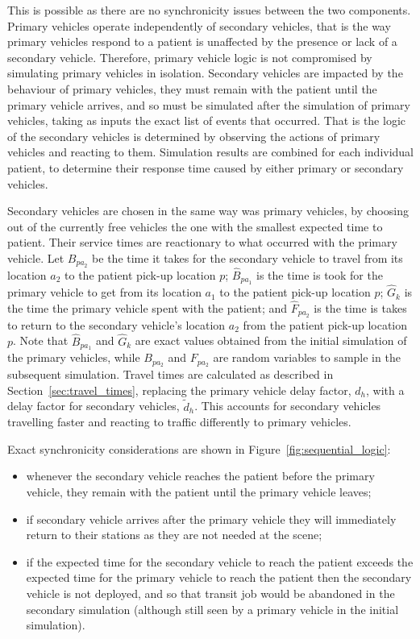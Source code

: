 \documentclass[preprint,12pt]{elsarticle}
\begin{document}
This is possible as there are no synchronicity issues between the two
components. Primary vehicles operate independently of secondary vehicles, that
is the way primary vehicles respond to a patient is unaffected by the presence
or lack of a secondary vehicle.
Therefore, primary vehicle logic is not compromised by simulating primary
vehicles in isolation.
Secondary vehicles are impacted by the behaviour of primary vehicles, they
must remain with the patient until the primary vehicle arrives, and so must be
simulated after the simulation of primary vehicles, taking as inputs the exact
list of events that occurred. That is the logic of the secondary vehicles is
determined by observing the actions of primary vehicles and reacting to them.
Simulation results are combined for each individual patient, to determine
their response time caused by either primary or secondary vehicles.

Secondary vehicles are chosen in the same way was primary vehicles, by choosing
out of the currently free vehicles the one with the smallest expected time to
patient. Their service times are reactionary to what occurred with the primary
vehicle.
Let $B_{pa_2}$ be the time it takes for the secondary vehicle to travel from
its location $a_2$ to the patient pick-up location $p$; $\hat{B}_{pa_1}$ is the
time is took for the primary vehicle to get from its location $a_1$ to the
patient pick-up location $p$; $\hat{G}_k$ is the time the primary vehicle spent
with the patient; and $\hat{F}_{pa_2}$ is the time is takes to return to the
secondary vehicle's location $a_2$ from the patient pick-up location $p$.
Note that $\hat{B}_{pa_1}$ and $\hat{G}_k$ are exact values obtained from the
initial simulation of the primary vehicles, while $B_{pa_2}$ and $F_{pa_2}$ are
random variables to sample in the subsequent simulation.
Travel times are calculated as described in Section~\ref{sec:travel_times},
replacing the primary vehicle delay factor, $d_h$, with a delay factor for
secondary vehicles, $\tilde{d}_h$. This accounts for secondary vehicles
travelling faster and reacting to traffic differently to primary vehicles.

Exact synchronicity considerations are shown in Figure~\ref{fig:sequential_logic}:
\begin{itemize}
  \item whenever the secondary vehicle reaches the patient before the primary
  vehicle, they remain with the patient until the primary vehicle leaves;
  \item if secondary vehicle arrives after the primary vehicle they will
  immediately return to their stations as they are not needed at the scene;
  \item if the expected time for the secondary vehicle to reach the patient
  exceeds the expected time for the primary vehicle to reach the patient then
  the secondary vehicle is not deployed, and so that transit job would be
  abandoned in the secondary simulation (although still seen by a primary
  vehicle in the initial simulation).
\end{itemize}
\end{document}
